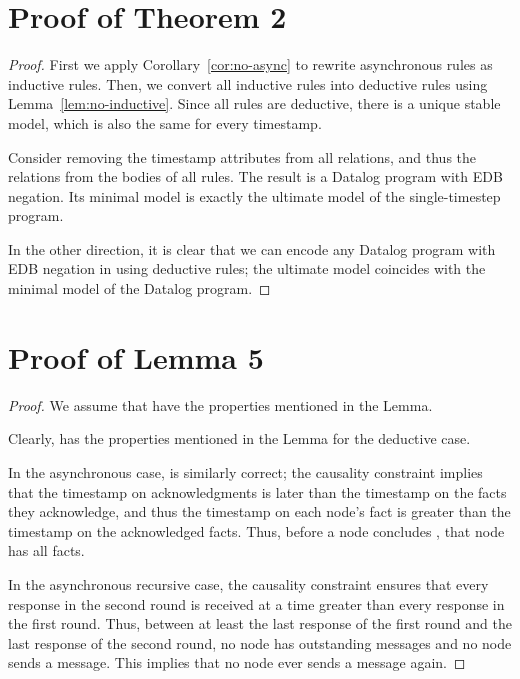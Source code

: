 \section{Proof of Theorem 2}
\begin{proof}                                                                  
                                                                               First we apply Corollary~\ref{cor:no-async} to rewrite asynchronous rules as inductive rules.  Then, we convert all inductive rules into deductive rules using Lemma~\ref{lem:no-inductive}.  Since all rules are deductive, there is a unique stable model, which is also the same for every timestamp.                    

Consider removing the timestamp attributes from all relations, and thus the  relations from the bodies of all rules.  The result is a Datalog program with EDB negation.  Its minimal model is exactly the ultimate model of the single-timestep \slang program.                                              

In the other direction, it is clear that we can encode any Datalog program with EDB negation in \slang using deductive rules; the ultimate model coincides with the minimal model of the Datalog program.                                    
\end{proof}

\section{Proof of Lemma 5}
\begin{proof}                                                                  
We assume that  have the properties mentioned in the Lemma.                                           

Clearly,  has the properties mentioned in the Lemma for the deductive case.                                                                 

In the asynchronous case,  is similarly correct; the causality constraint implies that the timestamp on acknowledgments is later than the timestamp on the facts they acknowledge, and thus the timestamp on each node's  fact is greater than the timestamp on the acknowledged facts.  Thus, before a node concludes , that node has all  facts.                                                             

In the asynchronous recursive case, the causality constraint ensures that every response in the second round is received at a time greater than every response in the first round.  Thus, between at least the last response of the first round and the last response of the second round, no node has outstanding messages and no node sends a message.  This implies that no node ever sends a message again.                                                                           
\end{proof}
